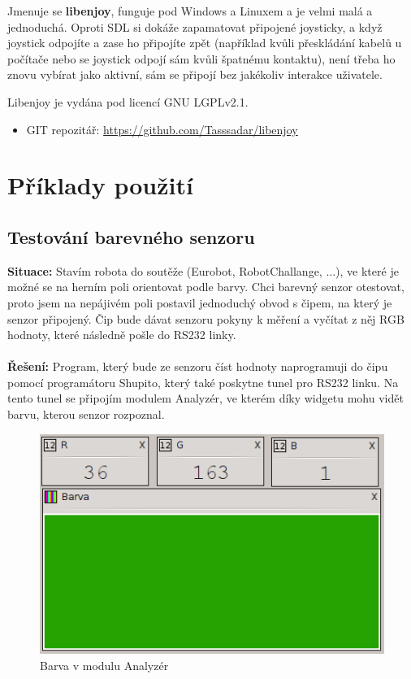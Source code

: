 \documentclass[12pt, a4paper, oneside]{article}
\begin{document}
Jmenuje se {\bf libenjoy}, funguje pod Windows a Linuxem a je velmi malá a jednoduchá. Oproti SDL si dokáže zapamatovat připojené joysticky, a když joystick odpojíte a zase ho připojíte zpět (například kvůli přeskládání kabelů u počítače nebo se joystick odpojí sám kvůli špatnému kontaktu), není třeba ho znovu vybírat jako aktivní, sám se připojí bez jakékoliv interakce uživatele.

Libenjoy je vydána pod licencí GNU LGPLv2.1\cite{lgpl}.

\begin{itemize}
\item GIT repozitář: \url{https://github.com/Tasssadar/libenjoy}
\end{itemize}

\newpage
\section{Příklady použití}
\subsection{Testování barevného senzoru}
{\bf Situace:} Stavím robota do soutěže (Eurobot, RobotChallange, ...), ve které je možné se na herním poli orientovat podle barvy. Chci barevný senzor otestovat, proto jsem na nepájivém poli postavil jednoduchý obvod s čipem, na který je senzor připojený. Čip bude dávat senzoru pokyny k měření a vyčítat z něj RGB hodnoty, které následně pošle do RS232 linky.\\
\\
{\bf Řešení:} Program, který bude ze senzoru číst hodnoty naprogramuji do čipu pomocí programátoru Shupito, který také poskytne tunel pro RS232 linku. Na tento tunel se připojím modulem Analyzér, ve kterém díky widgetu  mohu vidět barvu, kterou senzor rozpoznal.

\begin{figure}[h]
\begin{center}
\includegraphics{img/use_color.png}
\caption{Barva v modulu Analyzér}
\end{center}
\end{figure}
\end{document}
